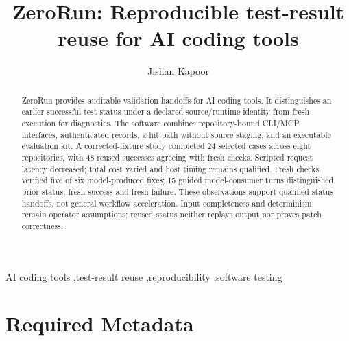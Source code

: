 \documentclass[preprint,12pt,a4paper]{elsarticle}
\begin{document}
\begin{frontmatter}
\title{ZeroRun: Reproducible test-result reuse for AI coding tools}
\author{Jishan Kapoor}
\address{Independent researcher, Toronto, Canada}
\begin{abstract}
ZeroRun provides auditable validation handoffs for AI coding tools. It distinguishes an earlier successful test status under a declared source/runtime identity from fresh execution for diagnostics. The software combines repository-bound CLI/MCP interfaces, authenticated records, a hit path without source staging, and an executable evaluation kit. A corrected-fixture study completed 24 selected cases across eight repositories, with 48 reused successes agreeing with fresh checks. Scripted request latency decreased; total cost varied and host timing remains qualified. Fresh checks verified five of six model-produced fixes; 15 guided model-consumer turns distinguished prior status, fresh success and fresh failure. These observations support qualified status handoffs, not general workflow acceleration. Input completeness and determinism remain operator assumptions; reused status neither replays output nor proves patch correctness.
\end{abstract}
\begin{keyword}
AI coding tools \sep test-result reuse \sep reproducibility \sep software testing
\end{keyword}
\end{frontmatter}
\clearpage

\section*{Required Metadata}
\end{document}
